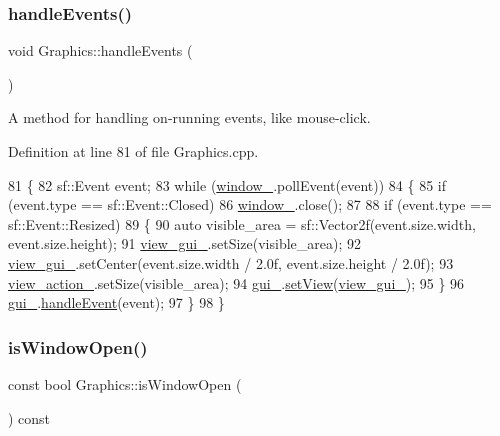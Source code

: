 \subsubsection{\texorpdfstring{handle\+Events()}{handleEvents()}}
{\footnotesize\ttfamily void Graphics\+::handle\+Events (\begin{DoxyParamCaption}{ }\end{DoxyParamCaption})}



A method for handling on-\/running events, like mouse-\/click. 



Definition at line 81 of file Graphics.\+cpp.


\begin{DoxyCode}
81                             \{
82     sf::Event event;
83     \textcolor{keywordflow}{while} (\hyperlink{classGraphics_ac760fe1abb0b648844c9f15afa087ef6}{window\_}.pollEvent(event))
84     \{
85         \textcolor{keywordflow}{if} (event.type == sf::Event::Closed)
86             \hyperlink{classGraphics_ac760fe1abb0b648844c9f15afa087ef6}{window\_}.close();
87 
88         \textcolor{keywordflow}{if} (event.type == sf::Event::Resized)
89         \{
90             \textcolor{keyword}{auto} visible\_area = sf::Vector2f(event.size.width, event.size.height);
91             \hyperlink{classGraphics_aaca5b237fae17f3166f8f28e4c363e06}{view\_gui\_}.setSize(visible\_area);
92             \hyperlink{classGraphics_aaca5b237fae17f3166f8f28e4c363e06}{view\_gui\_}.setCenter(event.size.width / 2.0f, event.size.height / 2.0f);
93             \hyperlink{classGraphics_a60792a296f5e93dbd1d086398e20cbd0}{view\_action\_}.setSize(visible\_area);
94             \hyperlink{classGraphics_ac582857f6b0de010eabd0146c4a5f4d2}{gui\_}.\hyperlink{classGraphicalUserInterface_ab0c8cd6460442a3ad01c304ec1216631}{setView}(\hyperlink{classGraphics_aaca5b237fae17f3166f8f28e4c363e06}{view\_gui\_});
95         \}
96         \hyperlink{classGraphics_ac582857f6b0de010eabd0146c4a5f4d2}{gui\_}.\hyperlink{classGraphicalUserInterface_a71964c3c49b23a05aa3fd4b4d36aa42d}{handleEvent}(event);
97     \}
98 \}
\end{DoxyCode}
\mbox{\label{classGraphics_a21729e7f5db9080db1a766682e64c43a}} 
\subsubsection{\texorpdfstring{is\+Window\+Open()}{isWindowOpen()}}
{\footnotesize\ttfamily const bool Graphics\+::is\+Window\+Open (\begin{DoxyParamCaption}{ }\end{DoxyParamCaption}) const}



